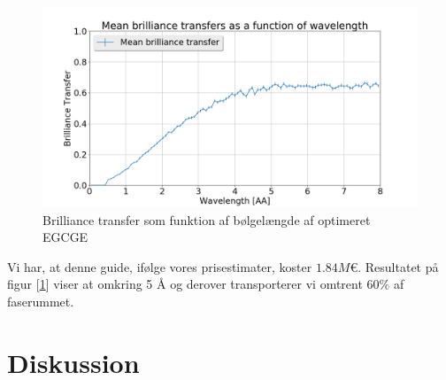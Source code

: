 \documentclass[12pt,oneside,a4paper]{article}
\begin{document}
{{{{{\begin{figure}[H]
\centering
\includegraphics[width=1\textwidth]{brill_optimized_mean_148957776280566.png}
\caption{Brilliance transfer som funktion af bølgelængde af optimeret EGCGE} \label{EGCGE_brill}
\end{figure}
Vi har, at denne guide, ifølge vores prisestimater, koster $1.84M\text{€}$. Resultatet på figur [\ref{EGCGE_brill}] viser at omkring 5 Å og derover transporterer vi omtrent $60\%$ af faserummet.

\section{Diskussion}

}}}}}
\end{document}
